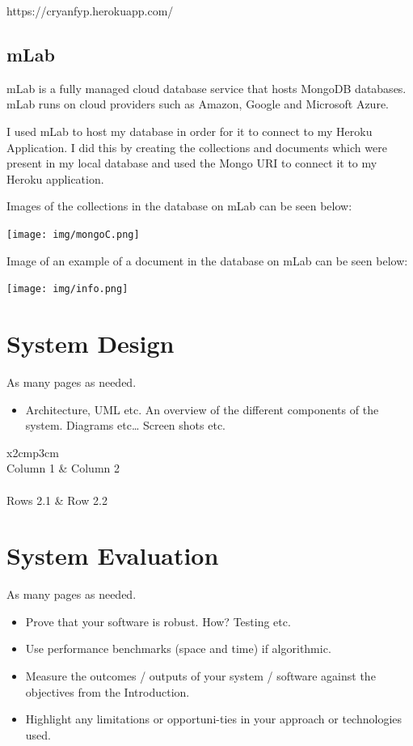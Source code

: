   https://cryanfyp.herokuapp.com/
  
  
  \section{mLab}
  mLab is a fully managed cloud database service that hosts MongoDB databases. mLab runs on cloud providers such as Amazon, Google and Microsoft Azure.
  
  I used mLab to host my database in order for it to connect to my Heroku Application. I did this by creating the collections and documents which were present in my local database and used the Mongo URI to connect it to my Heroku application. 
  
  Images of the collections in the database  on mLab can be seen below:
  \begin{center}    
  \texttt{[image: img/mongoC.png]}
  \end{center}
  
  Image of an example of a document in the database on mLab can be seen below:
  \begin{center}    
  \texttt{[image: img/info.png]}
  \end{center}
  

\chapter{System Design}
As many pages as needed.
\begin{itemize}
\item Architecture, UML etc. An overview of the different components of the system. Diagrams etc… Screen shots etc.
\end{itemize}

\begin{table}[h]
  \centering
  \begin{tabular}{x{2cm}p{3cm}}
    \toprule \\
    Column 1 & Column 2 \\
    \midrule \\
    Rows 2.1 & Row 2.2 \\
    \bottomrule
  \end{tabular}
  \caption{A table.}
  \label{table:mytable}
\end{table}

\chapter{System Evaluation}
As many pages as needed.
\begin{itemize}
\item Prove that your software is robust. How? Testing etc. 
\item Use performance benchmarks (space and time) if algorithmic.
\item Measure the outcomes / outputs of your system / software against the objectives from the Introduction.
\item Highlight any limitations or opportuni-ties in your approach or technologies used.
\end{itemize}

